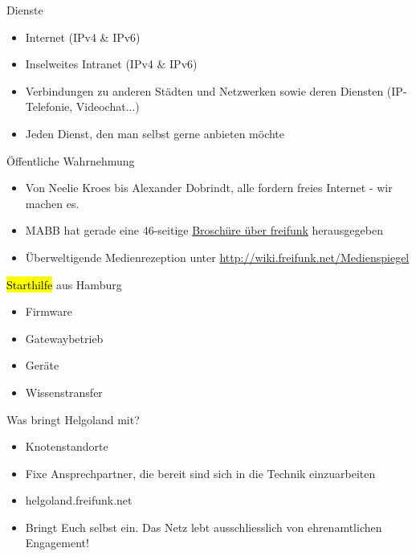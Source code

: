 \documentclass[t]{beamer}
\begin{document}
\begin{frame}{Dienste}
	\begin{itemize}
		\item Internet (IPv4 \& IPv6)
		\item Inselweites Intranet (IPv4 \& IPv6)
		\item Verbindungen zu anderen Städten und Netzwerken sowie deren Diensten (IP-Telefonie, Videochat...)
		\item Jeden Dienst, den man selbst gerne anbieten möchte
	\end{itemize}
\end{frame}

\begin{frame}{Öffentliche Wahrnehmung}
	\begin{itemize}
		\item Von Neelie Kroes bis Alexander Dobrindt, alle fordern freies Internet - wir machen es.
		\item MABB hat gerade eine 46-seitige \href{http://mabb.de/presse/pressemitteilungen/details/wlan-fuer-alle-freie-funknetze-in-der-praxis.html}{Broschüre über freifunk} herausgegeben 
		\item Überweltigende Medienrezeption unter \href{http://wiki.freifunk.net/Medienspiegel}{http://wiki.freifunk.net/Medienspiegel}
	\end{itemize}
\end{frame}

\begin{frame}{\hl{Starthilfe} aus Hamburg}
	\begin{itemize}
		\item Firmware
		\item Gatewaybetrieb
		\item Geräte
		\item Wissenstransfer
	\end{itemize}
\end{frame}


\begin{frame}{Was bringt Helgoland mit?}
	\begin{itemize}
		\item Knotenstandorte
		\item Fixe Ansprechpartner, die bereit sind sich in die Technik einzuarbeiten
		\item helgoland.freifunk.net
		\item Bringt Euch selbst ein. Das Netz lebt ausschliesslich von ehrenamtlichen Engagement!
	\end{itemize}
\end{frame}
\end{document}
